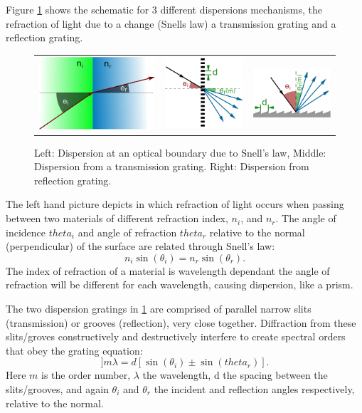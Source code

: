 Figure \cref{fig:dispersion_elements} shows the schematic for 3 different dispersions mechanisms, the refraction of light due to a change (Snells law) a transmission grating and a reflection grating.
\begin{figure}
    \centering
    \begin{tabular}{ccc}
   \includegraphics[width=0.3\linewidth]{figures/spectroscopy/snells_law} & \includegraphics[width=0.2\linewidth]{figures/spectroscopy/dispersion_grism-transmission} & \includegraphics[width=0.3\linewidth]{figures/spectroscopy/dispersion_grism-reflection} \\
\end{tabular}
    \caption{Left: Dispersion at an optical boundary due to Snell's law, Middle: Dispersion from a transmission grating. Right: Dispersion from reflection grating.}
    \label{fig:dispersion_elements}
\end{figure}
The left hand picture depicts in which refraction of light occurs when passing between two materials of different refraction index, $n_i$, and $n_r$. The angle of incidence $theta_i$ and angle of refraction $theta_r$ relative to the normal (perpendicular) of the surface are related through Snell's law:
\[n_i \sin(\theta_i) = n_r \sin(\theta_r).\] 
The index of refraction of a material is wavelength dependant the angle of refraction will be different for each wavelength, causing dispersion, like a prism. 

The two dispersion gratings in \cref{fig:dispersion_elements} are comprised of parallel narrow slits (transmission) or grooves (reflection), very close together. Diffraction from these slits/groves constructively and destructively interfere to create spectral orders that obey the grating equation:
\begin{equation}
]m \lambda = d [\sin(\theta_i) \pm \sin(theta_r)].
\end{equation}
Here $m$ is the order number, $\lambda$ the wavelength, d the spacing between the slits/grooves, and again $\theta_i$ and $\theta_r$ the incident and reflection angles respectively, relative to the normal.

